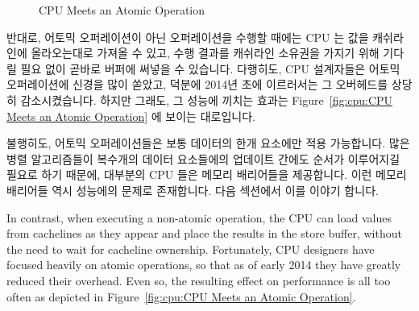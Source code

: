 \begin{figure}[htb]
\begin{center}
\end{center}
\caption{CPU Meets an Atomic Operation}
\end{figure}

반대로, 어토믹 오퍼레이션이 아닌 오퍼레이션을 수행할 때에는 CPU 는 값을
캐쉬라인에 올라오는대로 가져올 수 있고, 수행 결과를 캐쉬라인 소유권을 가지기
위해 기다릴 필요 없이 곧바로 버퍼에 써넣을 수 있습니다.
다행히도, CPU 설계자들은 어토믹 오퍼레이션에 신경을 많이 쏟았고, 덕분에 2014년
초에 이르러서는 그 오버헤드를 상당히 감소시켰습니다.
하지만 그래도, 그 성능에 끼치는 효과는 Figure~\ref{fig:cpu:CPU Meets an Atomic
Operation} 에 보이는 대로입니다.

불행히도, 어토믹 오퍼레이션들은 보통 데이터의 한개 요소에만 적용 가능합니다.
많은 병렬 알고리즘들이 복수개의 데이터 요소들에의 업데이트 간에도 순서가
이루어지길 필요로 하기 때문에, 대부분의 CPU 들은 메모리 배리어들을 제공합니다.
이런 메모리 배리어들 역시 성능에의 문제로 존재합니다. 다음 섹션에서 이를 이야기
합니다.

\iffalse
In contrast, when executing a non-atomic operation, the CPU can load
values from cachelines as they appear and place the results in the
store buffer, without the need to wait for cacheline ownership.
Fortunately, CPU designers have focused heavily on atomic operations,
so that as of early 2014 they have greatly reduced their overhead.
Even so, the resulting effect on performance is all too often as depicted in
Figure~\ref{fig:cpu:CPU Meets an Atomic Operation}.


